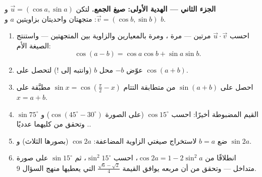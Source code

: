 \begin{problem}
\medskip
\noindent\textbf{الجزء الثاني --- الهدية الأولى: صيغ
الجمع.}
لتكن $\vec u = (\cos a, \sin a)$ و $\vec v = (\cos b, \sin b)$:
متجهتان واحديتان بزاويتين $a$ و $b$.
\begin{enumerate}[resume]
  \item احسب $\vec u \cdot \vec v$ مرتين --- مرة ،
        ومرة بالمعيارين والزاوية بين
        المتجهتين --- واستنتج الصيغة الأم:
        \[
        \cos(a - b) = \cos a \cos b + \sin a \sin b .
        \]
  \item عوّض $-b$ محل $b$ (وانتبه إلى    !)
        لتحصل على $\cos(a + b)$.
  \item احصل على $\sin(a + b)$ من متطابقة التتام
        $\sin x = \cos\left(\frac\pi2 - x\right)$ مطبَّقة على
        $x = a + b$.
  \item القيم المضبوطة أخيرًا: احسب $\cos 15^\circ$ (على الصورة
        $\cos(45^\circ - 30^\circ)$) و $\sin 75^\circ$. وتحقق
        من كليهما عدديًا.
  \item ضع $b = a$ لاستخراج صيغتي الزاوية المضاعفة:
        $\cos 2a$ (بصورها الثلاث) و $\sin 2a$.
  \item انطلاقًا من $\cos 2a = 1 - 2\sin^2 a$، احسب
        $\sin^2 15^\circ$، ثم $\sin 15^\circ$ على صورة 
        متداخل --- وتحقق من أن مربعه يوافق
        القيمة $\frac{\sqrt6 - \sqrt2}{4}$ التي يعطيها
        منهج السؤال 9.
\end{enumerate}


\end{problem}
